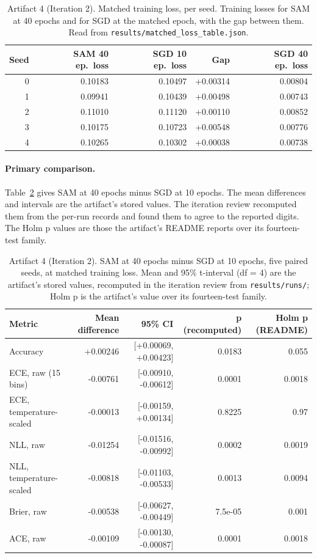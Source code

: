 \documentclass[11pt,letterpaper]{article}
\begin{document}
\begin{table}[!htbp]
\centering
\footnotesize
\caption{Artifact 4 (Iteration 2). Matched training loss, per seed. Training losses for SAM at 40 epochs and for SGD at the matched epoch, with the gap between them. Read from \texttt{results/matched\_loss\_table.json}.}
\label{tab:match}
\begin{tabular}{rrrrr}
\toprule
Seed & SAM 40 ep.\ loss & SGD 10 ep.\ loss & Gap & SGD 40 ep.\ loss \\
\midrule
0 & 0.10183 & 0.10497 & +0.00314 & 0.00804 \\
1 & 0.09941 & 0.10439 & +0.00498 & 0.00743 \\
2 & 0.11010 & 0.11120 & +0.00110 & 0.00852 \\
3 & 0.10175 & 0.10723 & +0.00548 & 0.00776 \\
4 & 0.10265 & 0.10302 & +0.00038 & 0.00738 \\
\bottomrule
\end{tabular}
\end{table}

\paragraph{Primary comparison.} Table~\ref{tab:primA4} gives SAM at 40 epochs minus SGD at 10 epochs. The mean differences and intervals are the artifact's stored values. The iteration review recomputed them from the per-run records and found them to agree to the reported digits. The Holm p values are those the artifact's README reports over its fourteen-test family.

\begin{table}[!htbp]
\centering
\footnotesize
\caption{Artifact 4 (Iteration 2). SAM at 40 epochs minus SGD at 10 epochs, five paired seeds, at matched training loss. Mean and 95\% t-interval (df = 4) are the artifact's stored values, recomputed in the iteration review from \texttt{results/runs/}; Holm p is the artifact's value over its fourteen-test family.}
\label{tab:primA4}
\begin{tabular}{lrrrr}
\toprule
Metric & Mean difference & 95\% CI & p (recomputed) & Holm p (README) \\
\midrule
Accuracy & +0.00246 & [+0.00069, +0.00423] & 0.0183 & 0.055 \\
ECE, raw (15 bins) & -0.00761 & [-0.00910, -0.00612] & 0.0001 & 0.0018 \\
ECE, temperature-scaled & -0.00013 & [-0.00159, +0.00134] & 0.8225 & 0.97 \\
NLL, raw & -0.01254 & [-0.01516, -0.00992] & 0.0002 & 0.0019 \\
NLL, temperature-scaled & -0.00818 & [-0.01103, -0.00533] & 0.0013 & 0.0094 \\
Brier, raw & -0.00538 & [-0.00627, -0.00449] & 7.5e-05 & 0.001 \\
ACE, raw & -0.00109 & [-0.00130, -0.00087] & 0.0001 & 0.0018 \\
\bottomrule
\end{tabular}
\end{table}
\end{document}
